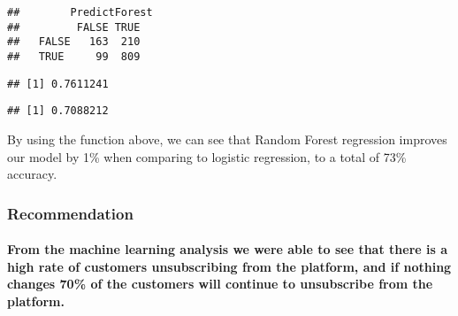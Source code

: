 \documentclass[]{article}
\newenvironment{Shaded}{\begin{snugshade}}{\end{snugshade}}
\newcommand{\DecValTok}[1]{\textcolor[rgb]{0.00,0.00,0.81}{#1}}
\newcommand{\CommentTok}[1]{\textcolor[rgb]{0.56,0.35,0.01}{\textit{#1}}}
\newcommand{\OperatorTok}[1]{\textcolor[rgb]{0.81,0.36,0.00}{\textbf{#1}}}
\newcommand{\NormalTok}[1]{#1}
\let\oldparagraph\paragraph
\renewcommand{\paragraph}[1]{\oldparagraph{#1}\mbox{}}
\begin{document}
\begin{verbatim}
##        PredictForest
##         FALSE TRUE
##   FALSE   163  210
##   TRUE     99  809
\end{verbatim}

\begin{Shaded}
\end{Shaded}

\begin{verbatim}
## [1] 0.7611241
\end{verbatim}

\begin{Shaded}
\end{Shaded}

\begin{verbatim}
## [1] 0.7088212
\end{verbatim}

By using the function above, we can see that Random Forest regression
improves our model by 1\% when comparing to logistic regression, to a
total of 73\% accuracy.

\subsubsection{Recommendation}\label{recommendation}

\paragraph{From the machine learning analysis we were able to see that
there is a high rate of customers unsubscribing from the platform, and
if nothing changes 70\% of the customers will continue to unsubscribe
from the
platform.}\label{from-the-machine-learning-analysis-we-were-able-to-see-that-there-is-a-high-rate-of-customers-unsubscribing-from-the-platform-and-if-nothing-changes-70-of-the-customers-will-continue-to-unsubscribe-from-the-platform.}
\end{document}
